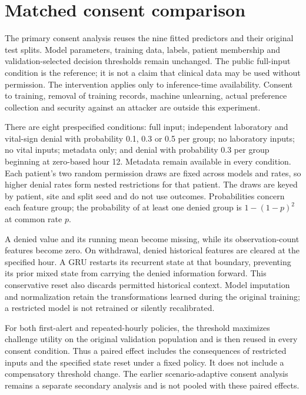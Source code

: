 \section*{Matched consent comparison}
The primary consent analysis reuses the nine fitted predictors and their original test splits. Model parameters, training data, labels, patient membership and validation-selected decision thresholds remain unchanged. The public full-input condition is the reference; it is not a claim that clinical data may be used without permission. The intervention applies only to inference-time availability. Consent to training, removal of training records, machine unlearning, actual preference collection and security against an attacker are outside this experiment.

There are eight prespecified conditions: full input; independent laboratory and vital-sign denial with probability 0.1, 0.3 or 0.5 per group; no laboratory inputs; no vital inputs; metadata only; and denial with probability 0.3 per group beginning at zero-based hour 12. Metadata remain available in every condition. Each patient's two random permission draws are fixed across models and rates, so higher denial rates form nested restrictions for that patient. The draws are keyed by patient, site and split seed and do not use outcomes. Probabilities concern each feature group; the probability of at least one denied group is $1-(1-p)^2$ at common rate $p$.

A denied value and its running mean become missing, while its observation-count features become zero. On withdrawal, denied historical features are cleared at the specified hour. A GRU restarts its recurrent state at that boundary, preventing its prior mixed state from carrying the denied information forward. This conservative reset also discards permitted historical context. Model imputation and normalization retain the transformations learned during the original training; a restricted model is not retrained or silently recalibrated.

For both first-alert and repeated-hourly policies, the threshold maximizes challenge utility on the original validation population and is then reused in every consent condition. Thus a paired effect includes the consequences of restricted inputs and the specified state reset under a fixed policy. It does not include a compensatory threshold change. The earlier scenario-adaptive consent analysis remains a separate secondary analysis and is not pooled with these paired effects.


